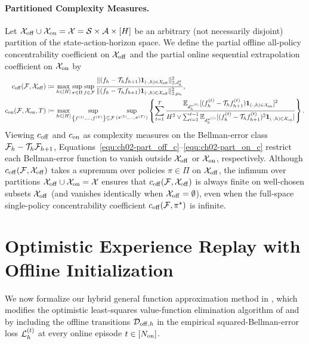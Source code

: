 \paragraph{Partitioned Complexity Measures.}
Let ${\mathcal{X}}_{{\operatorname{off}}} \cup {\mathcal{X}}_{{\operatorname{on}}} = {\mathcal{X}} = {\mathcal{S}} \times {\mathcal{A}} \times [H]$ be an arbitrary (not necessarily disjoint) partition of the state-action-horizon space. We define the partial offline all-policy concentrability coefficient on ${\mathcal{X}}_{{\operatorname{off}}}$ and the partial online sequential extrapolation coefficient on ${\mathcal{X}}_{{\operatorname{on}}}$ by
\begin{align}
    c_{{\operatorname{off}}}({\mathcal{F}}, {\mathcal{X}}_{{\operatorname{off}}}) 
    &\coloneqq \max_{h \in [H]} \sup_{\pi \in \Pi} \sup_{f \in {\mathcal{F}}} \frac{\|(f_h - {\mathcal{T}}_h f_{h+1}) \mathbf{1}_{(\cdot, h) \in {\mathcal{X}}_{{\operatorname{off}}}}\|_{2, d_h^\pi}^2}{\|(f_h - {\mathcal{T}}_h f_{h+1})\mathbf{1}_{(\cdot, h) \in {\mathcal{X}}_{{\operatorname{off}}}}\|_{2, \mu_{h}}^2}, \label{equ:ch02-part_off_c}\\
    c_{{\operatorname{on}}}({\mathcal{F}}, {\mathcal{X}}_{{\operatorname{on}}},T) 
    &\coloneqq \max_{h \in [H]} \sup_{\left\{f^{(1)}, \ldots, f^{(T)}\right\} \subseteq {\mathcal{F}}} \sup_{(\pi^{(1)}, \dots, \pi^{(T)})} \left\{\sum_{t=1}^T \frac{ \mathbb{E}_{d_h^{\pi^{(t)}}}[(f_h^{(t)} - {\mathcal{T}}_h f_{h+1}^{(t)}) \mathbf{1}_{(\cdot, h) \in {\mathcal{X}}_{{\operatorname{on}}}}]^2}{H^2 \vee \sum_{i=1}^{t-1} \mathbb{E}_{d_h^{\pi^{(i)}}}[(f_h^{(t)} - {\mathcal{T}}_h f_{h+1}^{(t)})^2 \mathbf{1}_{(\cdot, h) \in {\mathcal{X}}_{{\operatorname{on}}}}]}\right\}. \label{equ:ch02-part_on_c}
\end{align}
Viewing $c_{{\operatorname{off}}}$ and $c_{{\operatorname{on}}}$ as complexity measures on the Bellman-error class ${\mathcal{F}}_h - {\mathcal{T}}_h {\mathcal{F}}_{h+1}$, Equations~\eqref{equ:ch02-part_off_c}--\eqref{equ:ch02-part_on_c} restrict each Bellman-error function to vanish outside ${\mathcal{X}}_{{\operatorname{off}}}$ or ${\mathcal{X}}_{{\operatorname{on}}}$, respectively. Although $c_{{\operatorname{off}}}({\mathcal{F}}, {\mathcal{X}}_{{\operatorname{off}}})$ takes a supremum over policies $\pi \in \Pi$ on ${\mathcal{X}}_{{\operatorname{off}}}$, the infimum over partitions ${\mathcal{X}}_{{\operatorname{off}}} \cup {\mathcal{X}}_{{\operatorname{on}}} = {\mathcal{X}}$ ensures that $c_{{\operatorname{off}}}({\mathcal{F}}, {\mathcal{X}}_{{\operatorname{off}}})$ is always finite on well-chosen subsets ${\mathcal{X}}_{{\operatorname{off}}}$ (and vanishes identically when ${\mathcal{X}}_{{\operatorname{off}}} = \emptyset$), even when the full-space single-policy concentrability coefficient $c_{{\operatorname{off}}}({\mathcal{F}}, \pi^\star)$ is infinite.

\section{Optimistic Experience Replay with Offline Initialization}
\label{sec:ch02-gfa-alg}

We now formalize our hybrid general function approximation method in , which modifies the optimistic least-squares value-function elimination algorithm of \citet{jin2021bellmaneluder} and \citet{xie2022role} by including the offline transitions ${\mathcal{D}}_{{\operatorname{off}}, h}$ in the empirical squared-Bellman-error loss ${\mathcal{L}}_h^{(t)}$ at every online episode $t \in [N_{{\operatorname{on}}}]$.

